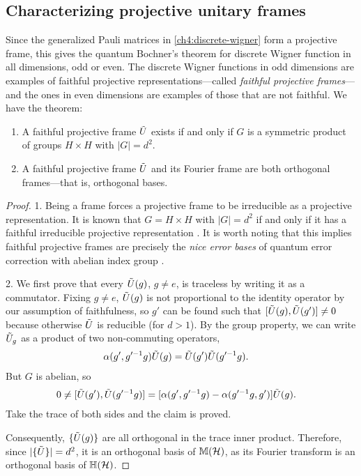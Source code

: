 \subsection{Characterizing projective unitary frames}

Since the generalized Pauli matrices in \autoref{ch4:discrete-wigner} form a projective frame, this gives the quantum Bochner's theorem for discrete Wigner function in all dimensions, odd or even. The discrete Wigner functions in odd dimensions are examples of faithful projective representations---called \emph{faithful projective frames}---and the ones in even dimensions are examples of those that are not faithful. %
We have the theorem:
\begin{theorem}
	\begin{enumerate}
		\item A faithful projective frame $\tilde{U}$ exists if and only if $G$
		is a symmetric product of groups $H \times H$ with $|G| = d^2$.
		\item A faithful projective frame $\tilde{U}$ and its Fourier frame are both orthogonal frames---that is, orthogonal bases.
	\end{enumerate}
\end{theorem}
\begin{proof}
	1. Being a frame forces a projective frame to be irreducible as a projective representation. It is known that $G=H \times H$ with $|G|= d^2$ if and only if it has a faithful irreducible projective representation \cite[Theorem 8.2.18]{Karpilovsky3}. It is worth noting that this implies faithful projective frames are precisely the \emph{nice error bases} of quantum error correction with abelian index group \cite{knill_group_1996}.
	
    2. We first prove that every $\tilde{U}(g)$, $g\neq e$, is traceless by writing it as a commutator. Fixing $g\neq e$, $\tilde{U}(g)$ is not proportional to the identity operator by our assumption of faithfulness, so $g'$ can be found such that $[\tilde{U}(g),\tilde{U}(g')] \neq 0$ because otherwise $\tilde{U}$ is reducible (for $d>1$). By the group property, we can write $\tilde{U}_{g}$ as a product of two non-commuting operators,
	\begin{align}
	\alpha(g',g'^{-1}g) \tilde{U}(g) &= \tilde{U}(g') \tilde{U}(g'^{-1}g).
	\end{align}
	But $G$ is abelian, so
	\begin{align}
	0 \neq [ \tilde{U}(g'), \tilde{U}(g'^{-1}g) ] &= [\alpha (g',g'^{-1}g) - \alpha (g'^{-1}g,g') ] \tilde{U}(g).
	\end{align}
	Take the trace of both sides and the claim is proved.
	
	Consequently, $\{ \tilde{U}(g) \}$ are all orthogonal in the trace inner product.
	Therefore, since $|\{\tilde{U}\}|=d^2$, it is an orthogonal basis of $\mathbb{M}(\mathcal{H})$, as its Fourier transform is an orthogonal basis of $\mathbb{H}(\mathcal{H})$.
\end{proof}



